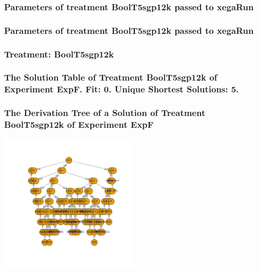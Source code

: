 \documentclass[18pt,c]{beamer}
\begin{document}

 \begin{frame}
 \fontsize{8pt}{9pt}\selectfont
 \frametitle{  Parameters of treatment BoolT5sgp12k passed to xegaRun
 }

 \label{ExpFtParmTable010.tex}  
 \end{frame}


 \begin{frame}
 \fontsize{8pt}{9pt}\selectfont
 \frametitle{  Parameters of treatment BoolT5sgp12k passed to xegaRun
 }

 \label{ExpFtParmTable011.tex}  
 \end{frame}

 \begin{frame}
 \fontsize{8pt}{9pt}\selectfont
 \frametitle{ Treatment: BoolT5sgp12k }

 \label{ExpFStatsTable008.tex}  
 \end{frame}

 \begin{frame}
 \fontsize{8pt}{9pt}\selectfont
 \frametitle{ The Solution Table of Treatment BoolT5sgp12k of Experiment ExpF. Fit: 0. Unique Shortest Solutions: 5. }

 \label{ExpFSolutionTable002.tex}  
 \end{frame}

 \begin{frame}
 \frametitle{ The Derivation Tree of a Solution of Treatment BoolT5sgp12k of Experiment ExpF }
 \begin{center}
\includegraphics[width=0.5\textwidth, angle=0]
{ExpFDerivationTreeFigure002.pdf}
 \end{center}
 \label{report/ExpFDerivationTreeFigure002.pdf}  
 \end{frame}
\end{document}

